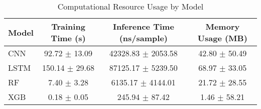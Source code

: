 
\begin{table}[htbp]
\centering
\caption{Computational Resource Usage by Model}
\begin{tabular}{lccc}
\hline
Model & Training Time (s) & Inference Time (ns/sample) & Memory Usage (MB) \\
\hline
CNN & 92.72 $\pm$ 13.09 & 42328.83 $\pm$ 2053.58 & 42.80 $\pm$ 50.49 \\
LSTM & 150.14 $\pm$ 29.68 & 87125.17 $\pm$ 5239.50 & 68.97 $\pm$ 33.05 \\
RF & 7.40 $\pm$ 3.28 & 6135.17 $\pm$ 4144.01 & 21.72 $\pm$ 28.55 \\
XGB & 0.18 $\pm$ 0.05 & 245.94 $\pm$ 87.42 & 1.46 $\pm$ 58.21 \\
\hline
\end{tabular}
\label{tab:resource_usage}
\end{table}

